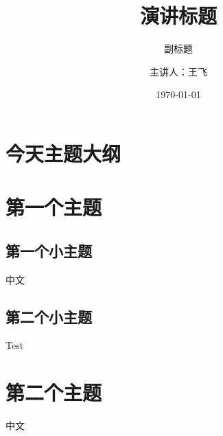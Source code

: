 \documentclass[xcolor=dvipsnames,CJK,t,hyperref={bookmarks=false}]{beamer}
\begin{document}
\begin{CJK*}{UTF8}{hei}
\title{演讲标题}
\subtitle{副标题}
\author{主讲人：王飞}
\date{\today}

\begin{frame}
\titlepage
\end{frame}

\section*{今天主题大纲}
\begin{frame}
  \setcounter{tocdepth}{3}
  \tableofcontents
\end{frame}
\section{第一个主题}
\subsection{第一个小主题}
\begin{frame}
中文
\end{frame}
\subsection{第二个小主题}
\begin{frame}Test\end{frame}

\section{第二个主题}
\begin{frame}
中文
\end{frame}
\end{CJK*}
\end{document}
